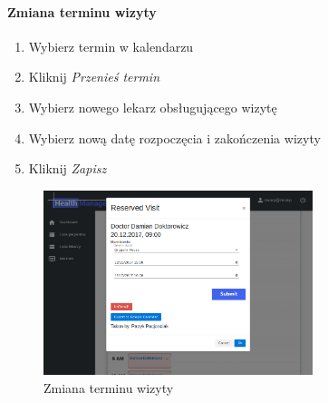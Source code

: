\documentclass[polish,12pt]{aghthesis}
\begin{document}
    \paragraph{Zmiana terminu wizyty}{
      \begin{enumerate}
        \item Wybierz termin w kalendarzu
        \item Kliknij \emph{Przenieś termin}
        \item Wybierz nowego lekarz obsługującego wizytę
        \item Wybierz nową datę rozpoczęcia i zakończenia wizyty
        \item Kliknij \emph{Zapisz}
      \end{enumerate}
        \begin{figure}[H]
        \includegraphics[width=0.7\textwidth]{gui-recep-moveslot}
        \caption{Zmiana terminu wizyty}
        \end{figure} 
    }
\end{document}
